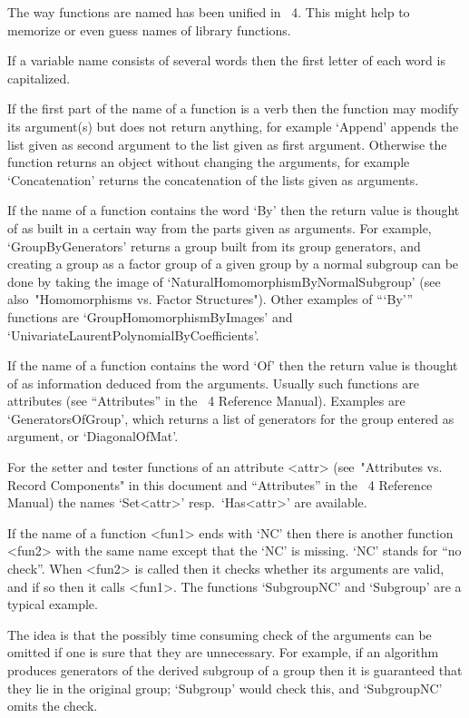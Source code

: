 
The way functions are named has been unified in {\GAP}~4.
This might help to memorize or even guess names of library functions.

If a variable name consists of several words then the first
letter of each word is capitalized.

If the first part of the name of a function is a verb then the function
may modify its argument(s) but does not return anything,
for example `Append' appends the list given as second argument to the
list given as first argument.
Otherwise the function returns an object without changing the arguments,
for example `Concatenation' returns the concatenation of the lists
given as arguments.

If the name of a function contains the word `By' then the return value is
thought of as built in a certain way from the parts given as arguments.
For example, `GroupByGenerators' returns a group built from its group
generators, and creating a group as a factor group of a given group
by a normal subgroup can be done by taking the image of
`NaturalHomomorphismByNormalSubgroup'
(see also~"Homomorphisms vs. Factor Structures").
Other examples of ```By''' functions are `GroupHomomorphismByImages' and
`UnivariateLaurentPolynomialByCoefficients'.

If the name of a function contains the word `Of' then the return value is
thought of as information deduced from the arguments.
Usually such functions are attributes
(see ``Attributes'' in the {\GAP}~4 Reference Manual).
Examples are `GeneratorsOfGroup', which returns a list of generators for
the group entered as argument, or `DiagonalOfMat'.

For the setter and tester functions of an attribute <attr>
(see~"Attributes vs. Record Components" in this document
and ``Attributes'' in the {\GAP}~4 Reference Manual)
the names `Set<attr>' resp.~`Has<attr>' are available.

If the name of a function <fun1> ends with `NC' then there is another
function <fun2> with the same name except that the `NC' is missing.
`NC' stands for ``no check''.
When <fun2> is called then it checks whether its arguments are valid,
and if so then it calls <fun1>.
The functions `SubgroupNC' and `Subgroup' are a typical example.

The idea is that the possibly time consuming check of the arguments
can be omitted if one is sure that they are unnecessary.
For example, if an algorithm produces generators of the derived subgroup
of a group then it is guaranteed that they lie in the original group;
`Subgroup' would check this, and `SubgroupNC' omits the check.


